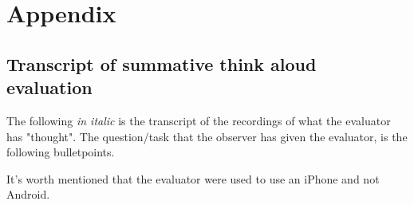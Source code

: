 \documentclass[runningheads,a4paper]{llncs}
\begin{document}
\section*{Appendix}

\subsection*{Transcript of summative think aloud evaluation}\label{transcript}
The following \textit{in italic} is the transcript of the recordings of what the evaluator has "thought". The question/task that the observer has given the evaluator, is the following bulletpoints. 

It's worth mentioned that the evaluator were used to use  an iPhone and not Android. \\
\end{document}
